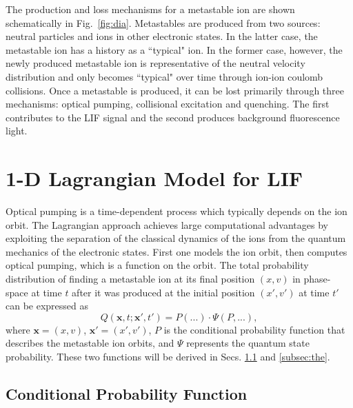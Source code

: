 \documentclass[aip,pop,reprint]{revtex4-1}
\begin{document}
The production and loss mechanisms for a metastable ion are shown schematically in Fig.~\ref{fig:dia}. Metastables are produced from two sources: neutral particles and ions in other electronic states. In the latter case, the metastable ion has a history as a ``typical" ion. In the former case, however, the newly produced metastable ion is representative of the neutral velocity distribution and only becomes ``typical" over time through ion-ion coulomb collisions. Once a metastable is produced, it can be lost primarily through three mechanisms: optical pumping, collisional excitation and quenching. The first contributes to the LIF signal and the second produces background fluorescence light.

\section{1-D Lagrangian Model for LIF}
\label{sec:theo}

Optical pumping is a time-dependent process which typically depends on the ion orbit. The Lagrangian approach achieves large computational advantages by exploiting the separation of the classical dynamics of the ions from the quantum mechanics of the electronic states. First one models the ion orbit, then computes optical pumping, which is a function on the orbit. The total probability distribution of finding a metastable ion at its final position $(x,v)$ in phase-space at time $t$ after it was produced at the initial position $(x',v')$ at time $t'$ can be expressed as
\begin{equation}
\label{eq:dist}
Q (\mathbf{x},t;\mathbf{x'},t')=P(...) \cdot \Psi(P,...),
\end{equation}
where $\mathbf{x}=(x,v)$, $\mathbf{x'}=(x',v')$, $P$ is the conditional probability function that describes the metastable ion orbits, and $\Psi$ represents the quantum state probability. These two functions will be derived in Secs. \ref{subsec:con} and \ref{subsec:the}. 

\subsection{Conditional Probability Function}
\label{subsec:con}
\end{document}
